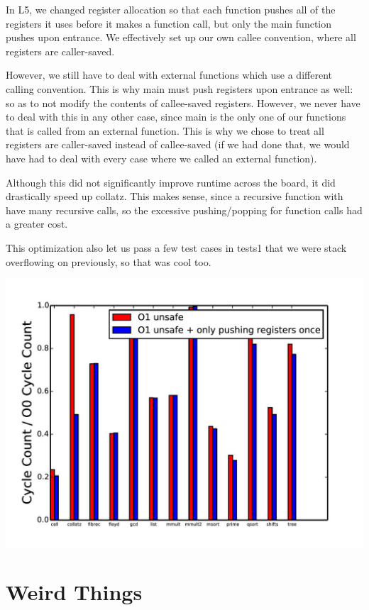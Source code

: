 \documentclass{article}
\begin{document}
In L5, we changed register allocation so that each function pushes all of the registers it uses before it makes a function call, but only the main function pushes upon entrance. We effectively set up our own callee convention, where all registers are caller-saved.

However, we still have to deal with external functions which use a different calling convention. This is why main must push registers upon entrance as well: so as to not modify the contents of callee-saved registers. However, we never have to deal with this in any other case, since main is the only one of our functions that is called from an external function. This is why we chose to treat all registers are caller-saved instead of callee-saved (if we had done that, we would have had to deal with every case where we called an external function).

Although this did not significantly improve runtime across the board, it did drastically speed up collatz. This makes sense, since a recursive function with have many recursive calls, so the excessive pushing/popping for function calls had a greater cost.

This optimization also let us pass a few test cases in tests1 that we were stack overflowing on previously, so that was cool too.

\includegraphics[scale=0.5]{O1_vs_onlyPushOnce-page-001}

\section{Weird Things}
\end{document}
